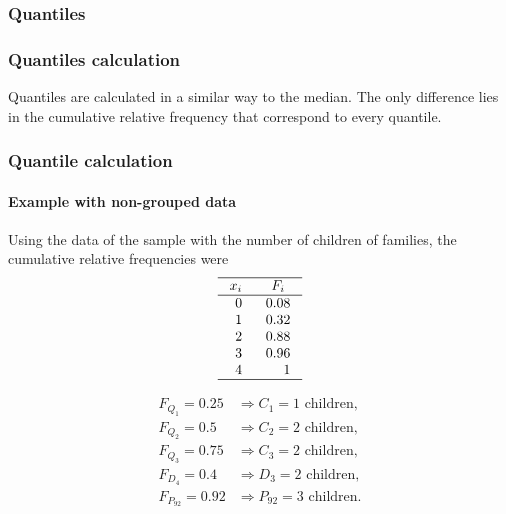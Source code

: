 \begin{frame}
\frametitle{Quantiles}
\begin{center}
\scalebox{0.8}{}
\end{center}
\end{frame}


\begin{frame}
\frametitle{Quantiles calculation}
Quantiles are calculated in a similar way to the median. 
The only difference lies in the cumulative relative frequency that correspond to every quantile.  
\begin{center}
\scalebox{0.6}{}
\end{center}
\end{frame}


\begin{frame}
\frametitle{Quantile calculation}
\framesubtitle{Example with non-grouped data}
Using the data of the sample with the number of children of families, the cumulative relative frequencies were
\[
\setlength\arraycolsep{3mm}
\setlength\arrayrulewidth{0.5pt}
\begin{array}{rr}
\hline
\multicolumn{1}{c}{x_i} & \multicolumn{1}{c}{F_i} \\
\hline
0 & 0.08\\
1 & 0.32\\
2 & 0.88\\
3 & 0.96\\
4 & 1\\
\hline
\end{array}
\]

\begin{align*}
F_{Q_1}=0.25 &\Rightarrow C_1 = 1 \text{ children},\\
F_{Q_2}=0.5 &\Rightarrow C_2 = 2 \text{ children},\\
F_{Q_3}=0.75 &\Rightarrow C_3 = 2 \text{ children},\\
F_{D_4}=0.4 &\Rightarrow D_3 = 2 \text{ children},\\
F_{P_{92}}=0.92 &\Rightarrow P_{92} = 3 \text{ children}.\\
\end{align*}
\end{frame}


